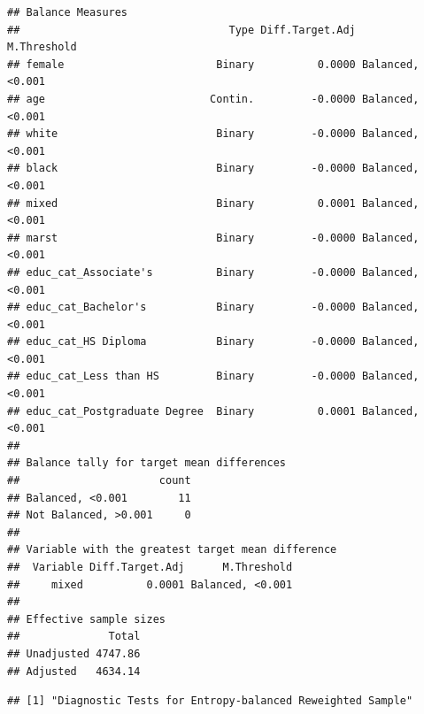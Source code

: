 \documentclass[
]{article}
\newenvironment{Shaded}{\begin{snugshade}}{\end{snugshade}}
\newcommand{\AttributeTok}[1]{\textcolor[rgb]{0.13,0.29,0.53}{#1}}
\newcommand{\CommentTok}[1]{\textcolor[rgb]{0.56,0.35,0.01}{\textit{#1}}}
\newcommand{\FunctionTok}[1]{\textcolor[rgb]{0.13,0.29,0.53}{\textbf{#1}}}
\newcommand{\NormalTok}[1]{#1}
\newcommand{\OtherTok}[1]{\textcolor[rgb]{0.56,0.35,0.01}{#1}}
\newcommand{\SpecialCharTok}[1]{\textcolor[rgb]{0.81,0.36,0.00}{\textbf{#1}}}
\begin{document}
\begin{verbatim}
## Balance Measures
##                                 Type Diff.Target.Adj      M.Threshold
## female                        Binary          0.0000 Balanced, <0.001
## age                          Contin.         -0.0000 Balanced, <0.001
## white                         Binary         -0.0000 Balanced, <0.001
## black                         Binary         -0.0000 Balanced, <0.001
## mixed                         Binary          0.0001 Balanced, <0.001
## marst                         Binary         -0.0000 Balanced, <0.001
## educ_cat_Associate's          Binary         -0.0000 Balanced, <0.001
## educ_cat_Bachelor's           Binary         -0.0000 Balanced, <0.001
## educ_cat_HS Diploma           Binary         -0.0000 Balanced, <0.001
## educ_cat_Less than HS         Binary         -0.0000 Balanced, <0.001
## educ_cat_Postgraduate Degree  Binary          0.0001 Balanced, <0.001
## 
## Balance tally for target mean differences
##                      count
## Balanced, <0.001        11
## Not Balanced, >0.001     0
## 
## Variable with the greatest target mean difference
##  Variable Diff.Target.Adj      M.Threshold
##     mixed          0.0001 Balanced, <0.001
## 
## Effective sample sizes
##              Total
## Unadjusted 4747.86
## Adjusted   4634.14
\end{verbatim}

\begin{Shaded}
\end{Shaded}

\begin{verbatim}
## [1] "Diagnostic Tests for Entropy-balanced Reweighted Sample"
\end{verbatim}
\end{document}
